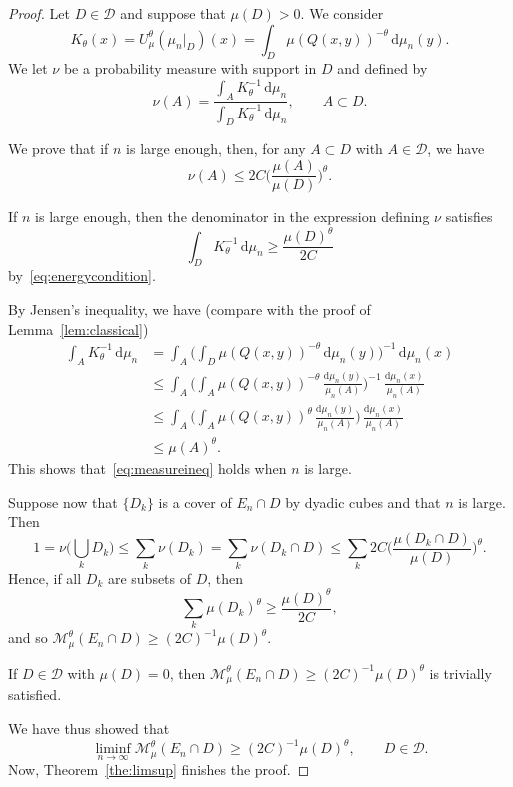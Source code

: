 \documentclass[10pt]{amsart}
\theoremstyle{definition}\newtheorem{defi}[theo]{Definition}\newtheorem{rema}[theo]{Remark}\newtheorem{exam}[theo]{Example}\newtheorem{exem}[theo]{Example}\newtheorem{nota}[theo]{Notation}
\newcommand*{\dd}{\mathrm{d}}
\begin{document}
\begin{proof}
Let $D \in \mathscr{D}$ and suppose that $\mu (D) > 0$. We consider
\[
K_\theta (x) = U_\mu^\theta (\mu_n|_D) (x) = \int_D \mu (Q(x,y))^{-\theta} \, \dd \mu_n (y).
\]
We let $\nu$ be a probability measure with support in $D$ and defined by
\[
\nu (A) = \frac{\int_A K_\theta^{-1} \, \dd \mu_n}{\int_D K_\theta^{-1} \, \dd \mu_n}, \qquad A \subset D.
\]

We prove that if $n$ is large enough, then, for any $A \subset D$ with $A \in \mathscr{D}$, we have
\begin{equation}\label{eq:measureineq}
\nu (A) \leq 2 C \biggl(\frac{\mu (A)}{\mu (D)} \biggr)^\theta.
\end{equation}

If $n$ is large enough, then the denominator in the expression defining $\nu$ satisfies
\[
\int_D K_\theta^{-1} \, \dd \mu_n \geq
\frac{\mu(D)^\theta}{2C}
\]
by~\eqref{eq:energycondition}.

By Jensen's inequality, we have (compare with the proof of Lemma~\ref{lem:classical})
\begin{align*}
\int_A K_\theta^{-1} \, \dd \mu_n & = \int_A \biggl(\int_D
\mu (Q(x,y))^{-\theta} \, \dd \mu_n (y) \biggr)^{-1} \,
\dd \mu_n (x) \\ &\leq \int_A \biggl(\int_A \mu (Q(x,y))^{-\theta} \, \frac{\dd \mu_n (y)}{\mu_n (A)}
\biggr)^{-1} \, \frac{\dd \mu_n (x)}{\mu_n (A)} \\ &\leq
\int_A \biggl(\int_A \mu (Q(x,y))^{\theta} \, \frac{\dd
\mu_n (y)}{\mu_n (A)} \biggr) \, \frac{\dd \mu_n (x)}{\mu_n (A)} \\ &\leq \mu (A)^\theta.
\end{align*}
This shows that~\eqref{eq:measureineq} holds when $n$ is large.

Suppose now that $\{D_k\}$ is a cover of $E_n \cap D$ by dyadic cubes and that $n$ is large. Then
\[
1 = \nu \biggl(\bigcup_k D_k \biggr) \leq \sum_k \nu (D_k) = \sum_k
\nu (D_k \cap D) \leq \sum_k 2 C \biggl(\frac{\mu (D_k \cap D)}{\mu (D)} \biggr)^\theta.
\]
Hence, if all $D_k$ are subsets of $D$, then
\[
\sum_k \mu(D_k)^\theta \geq \frac{\mu (D)^\theta}{2 C},
\]
and so $\mathscr{M}_\mu^\theta (E_n \cap D) \geq (2C)^{-1} \mu (D)^\theta$.

If $D \in \mathscr{D}$ with $\mu (D) = 0$, then $\mathscr{M}_\mu^\theta (E_n \cap D) \geq (2C)^{-1} \mu (D)^\theta$ is trivially satisfied.

We have thus showed that
\[
\liminf_{n \to \infty} \mathscr{M}_\mu^\theta (E_n \cap D) \geq (2C)^{-1} \mu (D)^\theta, \qquad D \in \mathscr{D}.
\]
Now, Theorem~\ref{the:limsup} finishes the proof.
\end{proof}
\end{document}
